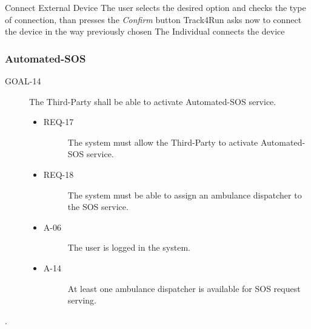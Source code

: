 \documentclass[a4paper]{article}
\newcommand{\requirement}{\ding{229}}%
\begin{document}
        
        \begin{usecase}{Connect External Device}
        {The user selects the desired option and checks the type of connection, than presses the \textit{Confirm} button}
        {Track4Run asks now to connect the device in the way previously chosen}
        {The Individual connects the device}
        \end{usecase}
        
        
        
        \subsubsection{Automated-SOS }
        
         \begin{description}
        	\item[GOAL-14] The Third-Party shall be able to activate Automated-SOS service.
            	\begin{itemize}
            	    \item[\requirement]
                	\begin{description}
                	\item[REQ-17] The system must allow the Third-Party to activate Automated-SOS service.
                	\end{description}
                	\item[\requirement]
                	\begin{description}
                	\item[REQ-18] The system must be able to assign an ambulance dispatcher to the SOS service.
                	\end{description}
                	\item
                	\begin{description}
                	\item[A-06] The user is logged in the system.
                	\end{description}
                	\item
                	\begin{description}
                	\item[A-14] At least one ambulance dispatcher is available for SOS request serving.       \end{description}
                	\end{itemize}
        \end{description}.
        
\end{document}
